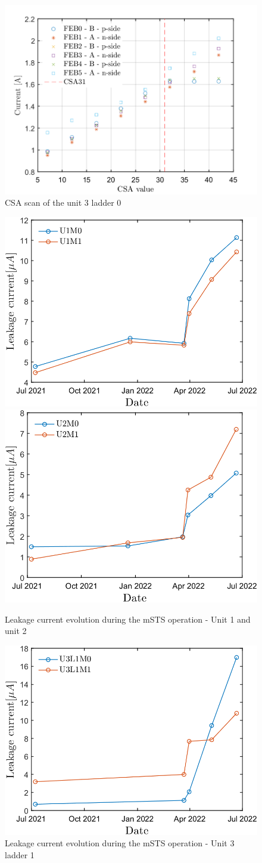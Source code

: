 \begin{figure}[h!]
\centering
\includegraphics[width=0.55\columnwidth]{Chapter6/DCS/images/U3L0CSABIAS.png}
\caption{CSA scan of the unit 3 ladder 0}
\label{U3L0CSABIAS}
\end{figure}


\begin{figure}[h!]
\centering
\includegraphics[width=0.45\columnwidth]{Chapter6/DCS/images/sensors/U1_leakage.png}
\includegraphics[width=0.45\columnwidth]{Chapter6/DCS/images/sensors/U2_leakage.png}
\caption{Leakage current evolution during the mSTS operation - Unit 1 and unit 2}
\label{leakage_current_u1u2}
\end{figure}

\begin{figure}[h!]
\centering
\includegraphics[width=0.55\columnwidth]{Chapter6/DCS/images/sensors/U3L1_leakage.png}
\caption{Leakage current evolution during the mSTS operation - Unit 3 ladder 1}
\label{leakage_current_u3l1}
\end{figure}





